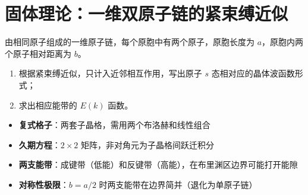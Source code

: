 \section{固体理论：一维双原子链的紧束缚近似}
\label{sec:1d-diatomic-tight-binding}

\begin{modelbox}[题目：一维双原子链的紧束缚能带]
由相同原子组成的一维原子链，每个原胞中有两个原子，原胞长度为 $a$，原胞内两个原子相对距离为 $b$。
\begin{enumerate}
    \item 根据紧束缚近似，只计入近邻相互作用，写出原子 $s$ 态相对应的晶体波函数形式；
    \item 求出相应能带的 $E(k)$ 函数。
\end{enumerate}
\end{modelbox}

\begin{tipbox}[考点快速分析]
\begin{itemize}
    \item \textbf{复式格子}：两套子晶格，需用两个布洛赫和线性组合
    \item \textbf{久期方程}：$2\times2$ 矩阵，非对角元为子晶格间跃迁积分
    \item \textbf{两支能带}：成键带（低能）和反键带（高能），在布里渊区边界可能打开能隙
    \item \textbf{对称性极限}：$b=a/2$ 时两支能带在边界简并（退化为单原子链）
\end{itemize}
\end{tipbox}

